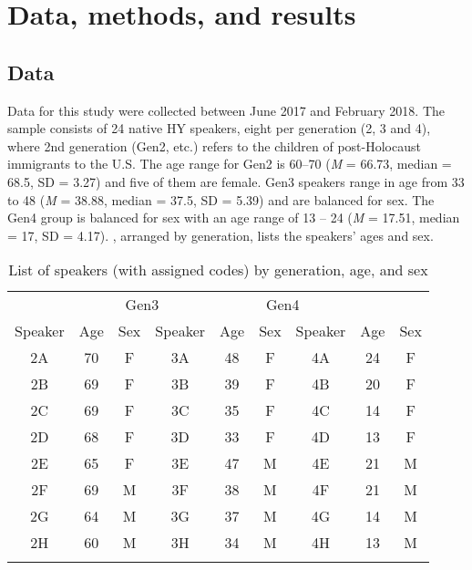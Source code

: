 \documentclass[output=paper]{langsci/langscibook}
\begin{document}
\section{Data, methods, and results}
\label{sec:nove:4}


 
\subsection{Data}
\label{sec:nove:4.1}


Data for this study were collected between June 2017 and February 2018. The sample consists of 24 native HY speakers, eight per generation (2, 3 and 4), where 2nd generation (Gen2, etc.) refers to the children of post-Holocaust immigrants to the U.S. The age range for Gen2 is 60--70 (\textit{M} = 66.73, median = 68.5, SD = 3.27) and five of them are female. Gen3 speakers range in age from 33 to 48 (\textit{M} = 38.88, median = 37.5, SD = 5.39) and are balanced for sex. The Gen4 group is balanced for sex with an age range of 13 – 24 (\textit{M} = 17.51, median = 17, SD = 4.17). , arranged by generation, lists the speakers’ ages and sex. 


\begin{table}[b]
	\begin{tabular}{ *{9}{c} }
	\lsptoprule
	\multicolumn{3}{c}{Gen2} & \multicolumn{3}{c}{Gen3} & \multicolumn{3}{c}{Gen4}\\\cmidrule(lr){1-3}\cmidrule(lr){4-6}\cmidrule(lr){7-9}
	{Speaker} & {Age} & Sex & {Speaker} & {Age} & Sex & {Speaker} & {Age} & Sex\\\midrule
	 2A & 70 & F & 3A & 48 & F & 4A & 24 & F\\
	 2B & 69 & F & 3B & 39 & F & 4B & 20 & F\\
 	 2C & 69 & F & 3C & 35 & F & 4C & 14 & F\\
 	 2D & 68 & F & 3D & 33 & F & 4D & 13 & F\\
 	 2E & 65 & F & 3E & 47 & M & 4E & 21 & M\\
 	 2F & 69 & M & 3F & 38 & M & 4F & 21 & M\\
 	 2G & 64 & M & 3G & 37 & M & 4G & 14 & M\\
 	 2H & 60 & M & 3H & 34 & M & 4H & 13 & M\\
	\lspbottomrule
	\end{tabular}
	\caption{List of speakers (with assigned codes) by generation, age, and sex}\label{tab:nove:1}
\end{table}
\end{document}
